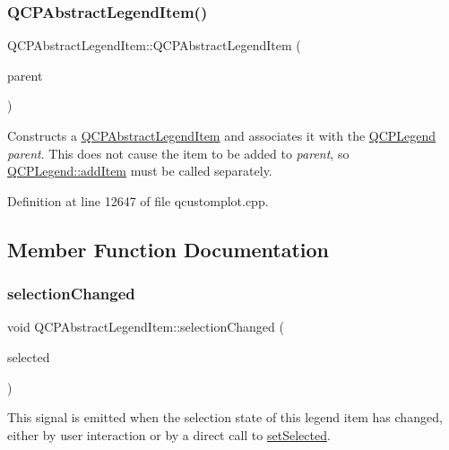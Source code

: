 \subsubsection{\texorpdfstring{Q\+C\+P\+Abstract\+Legend\+Item()}{QCPAbstractLegendItem()}}
{\footnotesize\ttfamily Q\+C\+P\+Abstract\+Legend\+Item\+::\+Q\+C\+P\+Abstract\+Legend\+Item (\begin{DoxyParamCaption}\item[{\hyperlink{class_q_c_p_legend}{Q\+C\+P\+Legend} $\ast$}]{parent }\end{DoxyParamCaption})\hspace{0.3cm}{\ttfamily [explicit]}}

Constructs a \hyperlink{class_q_c_p_abstract_legend_item}{Q\+C\+P\+Abstract\+Legend\+Item} and associates it with the \hyperlink{class_q_c_p_legend}{Q\+C\+P\+Legend} {\itshape parent}. This does not cause the item to be added to {\itshape parent}, so \hyperlink{class_q_c_p_legend_a3ab274de52d2951faea45a6d975e6b3f}{Q\+C\+P\+Legend\+::add\+Item} must be called separately. 

Definition at line 12647 of file qcustomplot.\+cpp.



\subsection{Member Function Documentation}
\mbox{\label{class_q_c_p_abstract_legend_item_a7cb61fdfbaf69c590bacb8f9e7099d9e}} 
\subsubsection{\texorpdfstring{selection\+Changed}{selectionChanged}}
{\footnotesize\ttfamily void Q\+C\+P\+Abstract\+Legend\+Item\+::selection\+Changed (\begin{DoxyParamCaption}\item[{bool}]{selected }\end{DoxyParamCaption})\hspace{0.3cm}{\ttfamily [signal]}}

This signal is emitted when the selection state of this legend item has changed, either by user interaction or by a direct call to \hyperlink{class_q_c_p_abstract_legend_item_a6eed93b0ab99cb3eabb043fb08179c2b}{set\+Selected}. \mbox{\label{class_q_c_p_abstract_legend_item_ac834bf9003c491e5064a31e2a7de418d}} 
